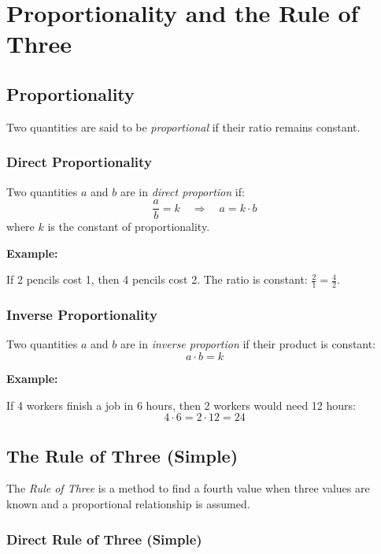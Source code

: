\newpage
\section{Proportionality and the Rule of Three}

\subsection{Proportionality}

Two quantities are said to be \emph{proportional} if their ratio remains constant.

\subsubsection{Direct Proportionality}

Two quantities \(a\) and \(b\) are in \emph{direct proportion} if:
\[
\frac{a}{b} = k \quad \Rightarrow \quad a = k \cdot b
\]
where \(k\) is the constant of proportionality.
\vspace{\baselineskip}

\textbf{Example:}
\vspace{\baselineskip}
 

If 2 pencils cost 1, then 4 pencils cost 2. The ratio is constant: \(\frac{2}{1} = \frac{4}{2}\).

\subsubsection{Inverse Proportionality}

Two quantities \(a\) and \(b\) are in \emph{inverse proportion} if their product is constant:
\[
a \cdot b = k
\]

\textbf{Example:}
\vspace{\baselineskip}

If 4 workers finish a job in 6 hours, then 2 workers would need 12 hours:
\[
4 \cdot 6 = 2 \cdot 12 = 24
\]

\subsection{The Rule of Three (Simple)}

The \emph{Rule of Three} is a method to find a fourth value when three values are known and a proportional relationship is assumed.

\subsubsection{Direct Rule of Three (Simple)}

